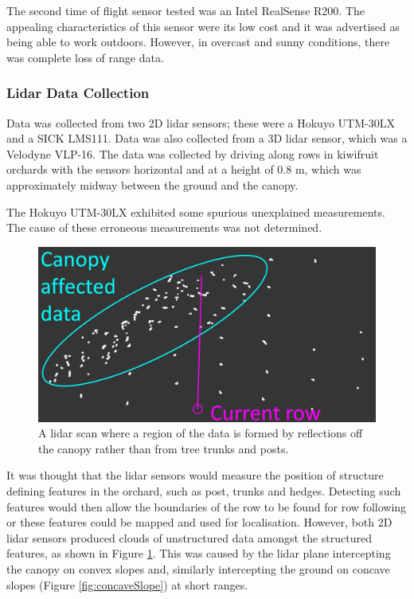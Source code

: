 \documentclass[preprint,authoryear,12pt]{elsarticle}
\begin{document}
    The second time of flight sensor tested was an Intel RealSense R200. The appealing characteristics of this sensor were its low cost and it was advertised as being able to work outdoors. However, in overcast and sunny conditions, there was complete loss of range data.

\subsubsection{Lidar Data Collection}
    Data was collected from two 2D lidar sensors; these were a Hokuyo UTM-30LX and a SICK LMS111. Data was also collected from a 3D lidar sensor, which was a Velodyne VLP-16. The data was collected by driving along rows in kiwifruit orchards with the sensors horizontal and at a height of 0.8 m, which was approximately midway between the ground and the canopy.

    The Hokuyo UTM-30LX exhibited some spurious unexplained measurements. The cause of these erroneous measurements was not determined.

    \begin{figure}[htb]
        \centering
        \includegraphics[width=\linewidth]{imgs/photos/canopyDataCloud.png}
        \caption{
            A lidar scan where a region of the data is formed by reflections off the canopy rather than from tree trunks and posts.
        }
        \label{fig:canopyDataCloud}
    \end{figure}

    It was thought that the lidar sensors would measure the position of structure defining features in the orchard, such as post, trunks and hedges. Detecting such features would then allow the boundaries of the row to be found for row following or these features could be mapped and used for localisation. However, both 2D lidar sensors produced clouds of unstructured data amongst the structured features, as shown in Figure \ref{fig:canopyDataCloud}. This was caused by the lidar plane intercepting the canopy on convex slopes and, similarly intercepting the ground on concave slopes (Figure \ref{fig:concaveSlope}) at short ranges.
\end{document}
